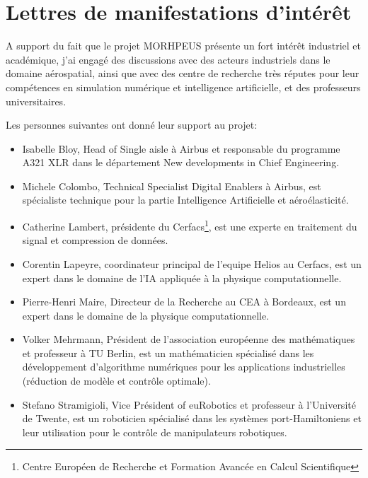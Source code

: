 \documentclass[12pt, french]{article}
\begin{document}
	\appendix
	
	\section{Lettres de manifestations d'intérêt}
	
	A support du fait que le projet MORHPEUS présente un fort intérêt industriel et académique, j'ai engagé des discussions avec des acteurs industriels dans le domaine aérospatial, ainsi que avec des centre de recherche très réputes pour leur compétences en simulation numérique et intelligence artificielle, et des professeurs universitaires. 
	
	Les personnes suivantes ont donné leur support au projet:
	\begin{itemize}
		\item Isabelle Bloy, Head of Single aisle  à Airbus et responsable du programme A321 XLR dans le département New developments in Chief Engineering.
		\item Michele Colombo, Technical Specialist Digital Enablers à Airbus, est spécialiste technique pour la partie Intelligence Artificielle et aéroélasticité.
		\item Catherine Lambert, présidente du Cerfacs\footnote{Centre Européen de Recherche et Formation Avancée en Calcul Scientifique}, est une experte en traitement du signal et compression de données. 
		\item Corentin Lapeyre, coordinateur principal de l'equipe Helios au Cerfacs, est un expert dans le domaine de l'IA appliquée à la physique computationnelle.
		\item Pierre-Henri Maire, Directeur de la Recherche au CEA à Bordeaux, est un expert dans le domaine de la physique computationnelle.
		\item Volker Mehrmann, Président de l'association européenne des mathématiques et professeur à TU Berlin, est un mathématicien spécialisé dans les développement d'algorithme numériques pour les applications industrielles (réduction de modèle et contrôle optimale).
		\item Stefano Stramigioli, Vice Président of euRobotics et professeur à l'Université de Twente, est un roboticien spécialisé dans les systèmes port-Hamiltoniens et leur utilisation pour le contrôle de manipulateurs robotiques.
	\end{itemize}


\end{document}
